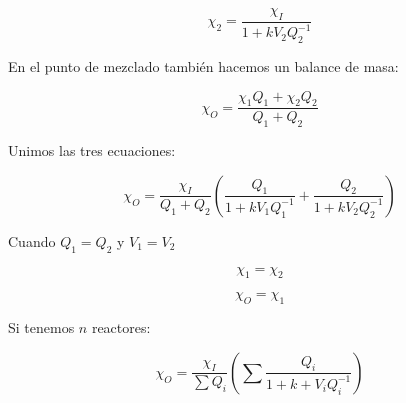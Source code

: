 \documentclass[11pt]{article}
\begin{document}
\[ \chi_2 = \frac{ \chi_I }{ 1 + k V_2 Q_{2}^{-1} } \]

En el punto de mezclado también hacemos un balance de masa:

\[ \chi_O = \frac{ \chi_1 Q_1 + \chi_2 Q_2 }{ Q_1 + Q_2 } \]

Unimos las tres ecuaciones:

\[ \boxed{ \chi_O = \frac{ \chi_I }{ Q_1 + Q_2 } \left( \frac{ Q_1 } { 1 + k V_1 Q_{1}^{-1} } + \frac{ Q_2 } { 1 + k V_2 Q_{2}^{-1} } \right) } \]

Cuando \( Q_1 = Q_2 \) y \( V_1 = V_2 \)

\[ \chi_1 = \chi_2 \]

\[ \chi_O = \chi_1 \]

Si tenemos \( n \) reactores:

\[ \boxed{ \chi_O = \frac{ \chi_I }{ \sum Q_i } \left( \displaystyle\sum \frac{ Q_i }{ 1 + k + V_i Q_{i}^{-1} } \right) } \]

\end{document}
